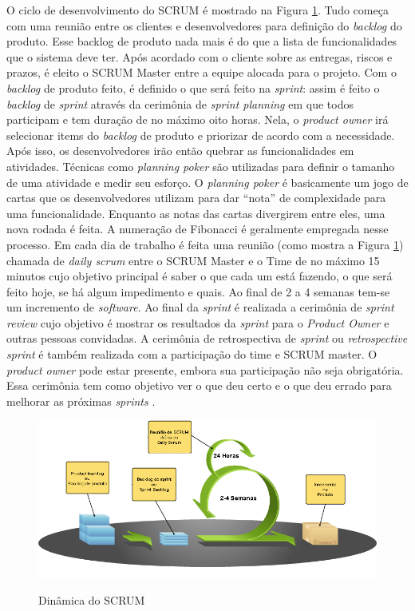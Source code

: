 O ciclo de desenvolvimento do SCRUM é mostrado na Figura \ref{fig:scrum}. Tudo começa com uma reunião entre os clientes e desenvolvedores para definição do \textit{backlog} do produto. Esse backlog de produto nada mais é do que a lista de funcionalidades que o sistema deve ter. Após acordado com o cliente sobre as entregas, riscos e prazos, é eleito o SCRUM Master entre a equipe alocada para o projeto. Com o \textit{backlog} de produto feito, é definido o que será feito na \textit{sprint}: assim é feito o \textit{backlog} de \textit{sprint} através da cerimônia de \textit{sprint planning} em que todos participam e tem duração de no máximo oito horas. Nela, o \textit{product owner} irá selecionar items do \textit{backlog} de produto e priorizar de acordo com a necessidade. Após isso, os desenvolvedores irão então quebrar as funcionalidades em atividades. Técnicas como \textit{planning poker} são utilizadas para definir o tamanho de uma atividade e medir seu esforço. O \textit{planning poker} é basicamente um jogo de cartas que os desenvolvedores utilizam para dar ``nota'' de complexidade para uma funcionalidade. Enquanto as notas das cartas divergirem entre eles, uma nova rodada é feita. A numeração de Fibonacci é geralmente empregada nesse processo. Em cada dia de trabalho é feita uma reunião (como mostra a Figura \ref{fig:scrum}) chamada de \textit{daily scrum} entre o SCRUM Master e o Time de no máximo 15 minutos cujo objetivo principal é saber o que cada um está fazendo, o que será feito hoje, se há algum impedimento e quais. Ao final de 2 a 4 semanas tem-se um incremento de \textit{software}. Ao final da \textit{sprint} é realizada a cerimônia de \textit{sprint review} cujo objetivo é mostrar os resultados da \textit{sprint} para o \textit{Product Owner} e outras pessoas convidadas. A cerimônia de retrospectiva de \textit{sprint} ou \textit{retrospective sprint} é também realizada com a participação do time e SCRUM master. O \textit{product owner} pode estar presente, embora sua participação não seja obrigatória. Essa cerimônia tem como objetivo ver o que deu certo e o que deu errado para melhorar as próximas \textit{sprints} \cite{macedo:12} \cite{cohn:11}. 

\begin{figure}[htb!]
\begin{center}
\caption{Dinâmica do SCRUM}
\label{fig:scrum}
\includegraphics[width=15cm]{assets/scrum} \\
\end{center}
\end{figure}

